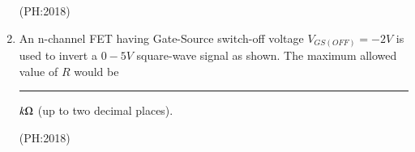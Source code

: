 \documentclass[journal,12pt,onecolumn]{IEEEtran}
\theoremstyle{remark}
\begin{document}
\begin{enumerate}
	  \hfill{(PH:2018)}
	  \begin{center}
		  
	  \end{center}

  \item
	  An n-channel FET having Gate-Source switch-off voltage $V_{GS(OFF)}=-2V$ is used to invert a $0-5V$ square-wave signal as shown. The maximum allowed value of $R$ would be \rule{2cm}{0.4pt}$k\ohm$ (up to two decimal places).

	  \hfill{(PH:2018)}
 \begin{center}
		  
	  \end{center}

\end{enumerate}
\end{document}
